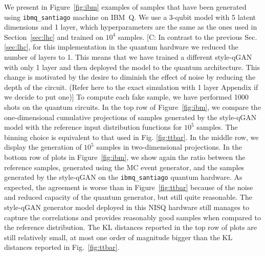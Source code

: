 \documentclass[twocolumn,preprintnumbers,superscriptaddress]{revtex4-2}
\newcommand{\commentCBP}[1]{{\color{red} {[C: #1]}}}
\begin{document}
We present in Figure~\ref{fig:ibm} examples of samples that have been generated using {\tt ibmq\_santiago} machine on IBM~Q. We use a 3-qubit model with 5 latent dimensions and 1 layer, which hyperparameters are the same as the ones used in Section~\ref{sec:lhc} and trained on $10^4_{}$ samples. \commentCBP{In contrast to the previous Sec. \ref{sec:lhc}, for this implementation in the quantum hardware we reduced the number of layers to 1. This means that we have trained a different style-qGAN with only 1 layer and then deployed the model to the quantum architecture. This change is motivated by the desire to diminish the effect of noise by reducing the depth of the circuit. (Refer here to the exact simulation with 1 layer Appendix if we decide to put one)} To compute each fake sample, we have performed 1000 shots on the quantum circuits. In the top row of Figure~\ref{fig:ibm}, we compare the one-dimensional cumulative projections of samples generated by the style-qGAN model with the reference input distribution functions for $10^5$ samples. The binning choice is equivalent to that used in Fig. \ref{fig:ttbar}. In the middle row, we display the generation of $10^5$ samples in two-dimensional projections. In the bottom row of plots in Figure~\ref{fig:ibm}, we show again the ratio between the reference samples, generated using the MC event generator, and the samples generated by the style-qGAN on the {\tt ibmq\_santiago} quantum hardware. As expected, the agreement is worse than in Figure~\ref{fig:ttbar} because of the noise and reduced capacity of the quantum generator, but still quite reasonable. The style-qGAN generator model deployed in this NISQ hardware still manages to capture the correlations and provides reasonably good samples when compared to the reference distribution. The  KL distances reported in the top row of plots are still relatively small, at most one order of magnitude bigger than the KL distances reported in Fig.~\ref{fig:ttbar}.
\end{document}
